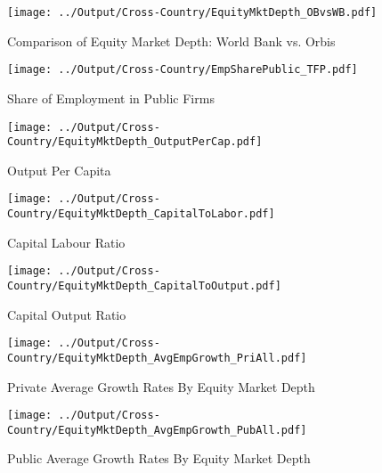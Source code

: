 \documentclass[12pt,notitlepage]{article}
\begin{document}
\begin{figure}[!htpb]
\centering
\caption{Comparison of Equity Market Depth: World Bank vs. Orbis}
 \texttt{[image: ../Output/Cross-Country/EquityMktDepth\_OBvsWB.pdf]}
\end{figure}


\begin{figure}[!htpb]
\centering
\caption{Share of Employment in Public Firms}
 \texttt{[image: ../Output/Cross-Country/EmpSharePublic\_TFP.pdf]}

\end{figure}




\begin{figure}[!htpb]
\centering
\caption{Output Per Capita}
 \texttt{[image: ../Output/Cross-Country/EquityMktDepth\_OutputPerCap.pdf]}
\end{figure}



\begin{figure}[!htpb]
\centering
\caption{Capital Labour Ratio}
 \texttt{[image: ../Output/Cross-Country/EquityMktDepth\_CapitalToLabor.pdf]}
\end{figure}

\begin{figure}[!htpb]
\centering
\caption{Capital Output Ratio}
 \texttt{[image: ../Output/Cross-Country/EquityMktDepth\_CapitalToOutput.pdf]}

\end{figure}



\begin{center}
\begin{figure}[htbp]

\centering
\caption{Private Average Growth Rates By Equity Market Depth}
 \texttt{[image: ../Output/Cross-Country/EquityMktDepth\_AvgEmpGrowth\_PriAll.pdf]}


\end{figure}
\end{center}



\begin{center}
\begin{figure}[htbp]

\centering
\caption{Public Average Growth Rates By Equity Market Depth}
 \texttt{[image: ../Output/Cross-Country/EquityMktDepth\_AvgEmpGrowth\_PubAll.pdf]}


\end{figure}
\end{center}
\end{document}
